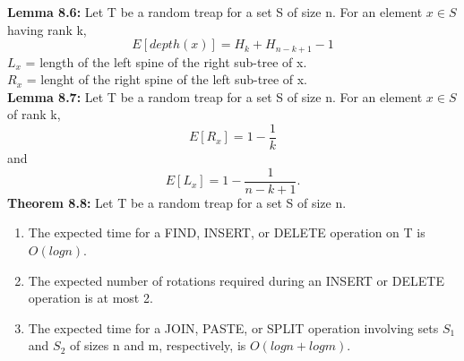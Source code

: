 \documentclass[12pt]{article}
\begin{document}
\textbf{Lemma 8.6:} Let T be a random treap for a set S of size n. For an element $x\in S$ having rank k, $$E[depth(x)]=H_k+H_{n-k+1}-1$$
$L_x$ = length of the left spine of the right sub-tree of x.\\
$R_x$ = lenght of the right spine of the left sub-tree of x.\\
\textbf{Lemma 8.7:} Let T be a random treap for a set S of size n. For an element $x\in S$ of rank k, $$E[R_x]=1-\frac{1}{k}$$ and $$E[L_x]=1-\frac{1}{n-k+1}.$$
\textbf{Theorem 8.8:} Let T be a random treap for a set S of size n. \begin{enumerate}\item The expected time for a FIND, INSERT, or DELETE operation on T is $O(logn)$.\item The expected number of rotations required during an INSERT or DELETE operation is at most 2.\item The expected time for a JOIN, PASTE, or SPLIT operation involving sets $S_1$ and $S_2$ of sizes n and m, respectively, is $O(logn+logm)$.\end{enumerate}
\end{document}
